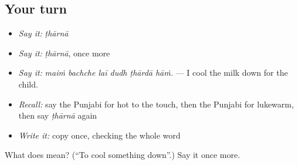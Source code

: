 \subsection*{Your turn}
\begin{itemize}
\raggedright
  \item \emph{Say it:} \emph{ṭhārnā}
  \item \emph{Say it:} \emph{ṭhārnā}, once more
  \item \emph{Say it:} \emph{maiṁ bachche laī dudh ṭhārdā hāṁ.} — I cool the milk down for the child.
  \item \emph{Recall:} say the Punjabi for hot to the touch, then the Punjabi for lukewarm, then say \emph{ṭhārnā} again
  \item \emph{Write it:} copy \textbf{} once, checking the whole word
\end{itemize}

\begin{tcolorbox}[breakable,colback=teal!4,colframe=teal!35!black,title={Before you move on}]
What does  mean? (\textquotedblleft{}To cool something down\textquotedblright{}.) Say it once more.
\end{tcolorbox}
